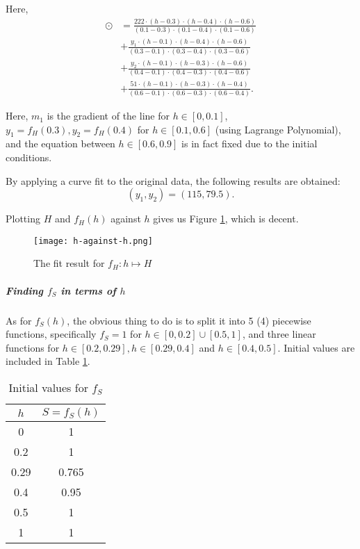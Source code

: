 Here,
\begin{align*}
    \odot & = \frac{222 \cdot (h - 0.3) \cdot (h - 0.4) \cdot (h - 0.6)}{(0.1 - 0.3) \cdot (0.1 - 0.4) \cdot (0.1 - 0.6)} \\
          & + \frac{y_1 \cdot (h - 0.1) \cdot (h - 0.4) \cdot (h - 0.6)}{(0.3 - 0.1) \cdot (0.3 - 0.4) \cdot (0.3 - 0.6)} \\
          & + \frac{y_2 \cdot (h - 0.1) \cdot (h - 0.3) \cdot (h - 0.6)}{(0.4 - 0.1) \cdot (0.4 - 0.3) \cdot (0.4 - 0.6)} \\
          & + \frac{51 \cdot (h - 0.1) \cdot (h - 0.3) \cdot (h - 0.4)}{(0.6 - 0.1) \cdot (0.6 - 0.3) \cdot (0.6 - 0.4)}.
\end{align*}

Here, \(m_1\) is the gradient of the line for \(h \in [0, 0.1]\), \(y_1 = f_H(0.3), y_2 = f_H(0.4)\) for \(h \in [0.1, 0.6]\) (using Lagrange Polynomial), and the equation between \(h \in [0.6, 0.9]\) is in fact fixed due to the initial conditions.

By applying a curve fit to the original data, the following results are obtained:
\[
    (y_1, y_2) = (115, 79.5).
\]

Plotting \(H\) and \(f_H(h)\) against \(h\) gives us Figure \ref{fig:h-against-h}, which is decent.

\begin{figure}[!ht]
    \centering
    \texttt{[image: h-against-h.png]}
    \caption{The fit result for \(f_H: h \mapsto H\)}
    \label{fig:h-against-h}
\end{figure}

\subparagraph{Finding \(f_S\) in terms of \(h\)}

As for \(f_S(h)\), the obvious thing to do is to split it into 5 (4) piecewise functions, specifically \(f_S = 1\) for \(h \in [0, 0.2] \cup [0.5, 1]\), and three linear functions for \(h \in [0.2, 0.29], h \in [0.29, 0.4]\) and \(h \in [0.4, 0.5]\). Initial values are included in Table \ref{tab:s-against-h-iv}.

\begin{table}[!ht]
    \centering

    \begin{tabular}{|c|c|}
        \hline
        \(h\) & \(S = f_S(h)\) \\
        \hline
        0     & 1              \\
        0.2   & 1              \\
        0.29  & 0.765          \\
        0.4   & 0.95           \\
        0.5   & 1              \\
        1     & 1              \\
        \hline
    \end{tabular}
    \caption{Initial values for \(f_S\)}
    \label{tab:s-against-h-iv}
\end{table}

